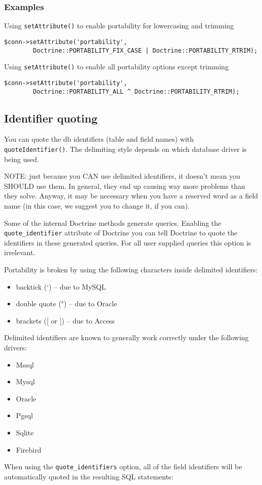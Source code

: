 \documentclass[11pt,a4paper]{report}
\begin{document}
\subsubsection{Examples}
Using \texttt{setAttribute()} to enable portability for lowercasing and trimming

\begin{verbatim}
$conn->setAttribute('portability',
        Doctrine::PORTABILITY_FIX_CASE | Doctrine::PORTABILITY_RTRIM);
\end{verbatim}

Using \texttt{setAttribute()} to enable all portability options except trimming

\begin{verbatim}
$conn->setAttribute('portability',
        Doctrine::PORTABILITY_ALL ^ Doctrine::PORTABILITY_RTRIM);
\end{verbatim}

\subsection{Identifier quoting}
You can quote the db identifiers (table and field names) with \texttt{quoteIdentifier()}. The delimiting style depends on which database driver is being used.

NOTE: just because you CAN use delimited identifiers, it doesn't mean you SHOULD use them. In general, they end up causing way more problems than they solve. Anyway, it may be necessary when you have a reserved word as a field name (in this case, we suggest you to change it, if you can).

Some of the internal Doctrine methods generate queries. Enabling the \texttt{quote\_identifier} attribute of Doctrine you can tell Doctrine to quote the identifiers in these generated queries. For all user supplied queries this option is irrelevant.

Portability is broken by using the following characters inside delimited identifiers:

\begin{itemize}
\item{backtick (`) -- due to MySQL}
\item{double quote (") -- due to Oracle}
\item{brackets ([ or ]) -- due to Access}
\end{itemize}
Delimited identifiers are known to generally work correctly under the following drivers:

\begin{itemize}
\item{Mssql}
\item{Mysql}
\item{Oracle}
\item{Pgsql}
\item{Sqlite}
\item{Firebird}
\end{itemize}
When using the \texttt{quote\_identifiers} option, all of the field identifiers will be automatically quoted in the resulting SQL statements:
\end{document}
